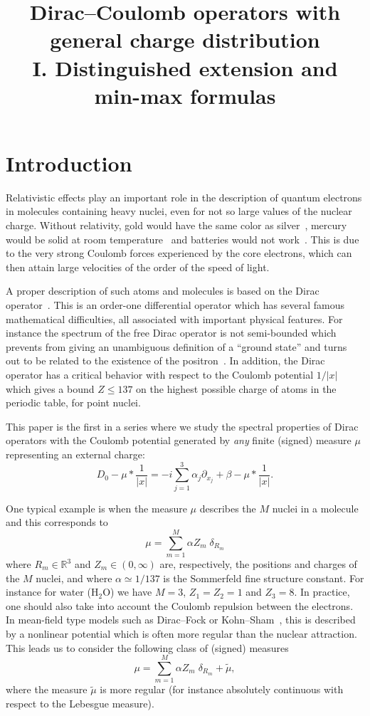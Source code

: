 \documentclass[AHL,Unicode,published]{cedram}
\title[Dirac--Coulomb operators with general charge distribution I]{Dirac--Coulomb operators with general charge distribution\\[0.2cm] I. Distinguished extension and min-max formulas}
\author[\initial{M. J.} \lastname{Esteban}]{\firstname{Maria} \middlename{J.} \lastname{Esteban}}
\author[\initial{M.} \lastname{Lewin}]{\firstname{Mathieu} \lastname{Lewin}}
\author[\initial{É.} \lastname{Séré}]{\firstname{Éric} \lastname{Séré}}
\newcommand{\R}{\mathbb{R}}
\newcommand\1{{\ensuremath {\mathds 1} }}
\newcommand{\ii}{\infty}
\renewcommand{\leq}{\leqslant}
\begin{document}
\maketitle



\section{Introduction}



Relativistic effects play an important role in the description of quantum electrons in molecules containing heavy nuclei, even for not so large values of the nuclear charge. Without relativity, gold would have the same color as silver~\cite{GlaAmb-10}, mercury would be solid at room temperature~\cite{CalPahWorSch-13} and batteries would not work~\cite{ZalPyy-11}. This is due to the very strong Coulomb forces experienced by the core electrons, which can then attain large velocities of the order of the speed of light.

A proper description of such atoms and molecules is based on the Dirac operator~\cite{EstLewSer-08,Thaller}. This is an order-one differential operator which has several famous mathematical difficulties, all associated with important physical features. For instance the spectrum of the free Dirac operator is not semi-bounded which prevents from giving an unambiguous definition of a ``ground state'' and turns out to be related to the existence of the positron~\cite{EstLewSer-08}. In addition, the Dirac operator has a critical behavior with respect to the Coulomb potential $1/|x|$ which gives a bound $Z\leq 137$ on the highest possible charge of atoms in the periodic table, for point nuclei.

This paper is the first in a series where we study the spectral properties of Dirac operators with the Coulomb potential generated by \emph{any} finite (signed) measure $\mu$ representing an external charge:
\begin{equation}\label{eq:general_form}
\boxed{D_0-\mu\ast\frac1{|x|}=-i\sum_{j=1}^3\alpha_j\partial_{x_j}+\beta-\mu\ast\frac1{|x|}.}
\end{equation}

\noindent One typical example is when the measure $\mu$ describes the $M$ nuclei in a molecule and this corresponds to
\[
\mu=\sum_{m=1}^M\alpha Z_m\;\delta_{R_m}
\]
where $R_m\in\R^3$ and $Z_m\in(0,\ii)$ are, respectively, the positions and charges of the $M$ nuclei, and where $\alpha\simeq 1/137$ is the Sommerfeld fine structure constant. For instance for water (H$_2$O) we have $M=3$, $Z_1=Z_2=1$ and $Z_3=8$. In practice, one should also take into account the Coulomb repulsion between the electrons. In mean-field type models such as Dirac--Fock or Kohn--Sham~\cite{EstSer-99}, this is described by a nonlinear potential which is often more regular than the nuclear attraction. This leads us to consider the following class of (signed) measures
\[
\mu=\sum_{m=1}^M\alpha Z_m\;\delta_{R_m}+\widetilde\mu,
\]
where the measure $\widetilde\mu$ is more regular (for instance absolutely continuous with respect to the Lebesgue measure).
\end{document}
